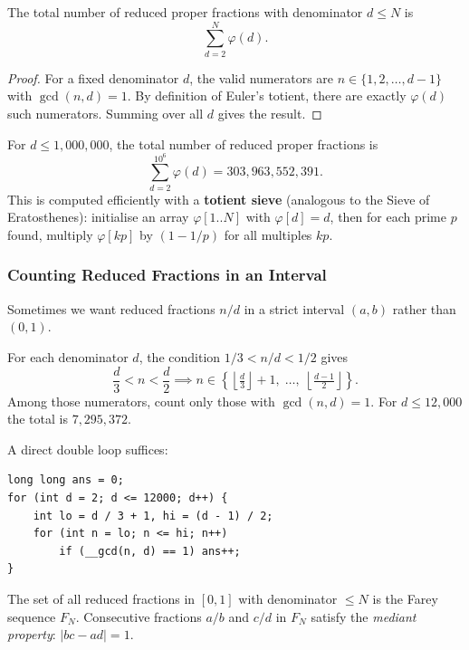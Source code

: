 \begin{theorem}
The total number of reduced proper fractions with denominator $d \le N$ is
\[
\sum_{d=2}^{N} \varphi(d).
\]
\end{theorem}
\begin{proof}
For a fixed denominator $d$, the valid numerators are $n \in \{1, 2, \ldots, d-1\}$ with $\gcd(n,d)=1$. By definition of Euler's totient, there are exactly $\varphi(d)$ such numerators. Summing over all $d$ gives the result.
\end{proof}

\begin{example}
For $d \le 1{,}000{,}000$, the total number of reduced proper fractions is
\[
\sum_{d=2}^{10^6} \varphi(d) = 303{,}963{,}552{,}391.
\]
This is computed efficiently with a \textbf{totient sieve} (analogous to the Sieve of Eratosthenes): initialise an array $\varphi[1..N]$ with $\varphi[d]=d$, then for each prime $p$ found, multiply $\varphi[kp]$ by $(1 - 1/p)$ for all multiples $kp$.
\end{example}

\subsubsection*{Counting Reduced Fractions in an Interval}

Sometimes we want reduced fractions $n/d$ in a strict interval $(a, b)$ rather than $(0,1)$.

\begin{example}
For each denominator $d$, the condition $1/3 < n/d < 1/2$ gives
\[
\frac{d}{3} < n < \frac{d}{2}
\implies n \in \left\{\left\lfloor\tfrac{d}{3}\right\rfloor + 1,\; \ldots,\; \left\lfloor\tfrac{d-1}{2}\right\rfloor\right\}.
\]
Among those numerators, count only those with $\gcd(n,d)=1$. For $d \le 12{,}000$ the total is $7{,}295{,}372$.

A direct double loop suffices:
\begin{verbatim}
long long ans = 0;
for (int d = 2; d <= 12000; d++) {
    int lo = d / 3 + 1, hi = (d - 1) / 2;
    for (int n = lo; n <= hi; n++)
        if (__gcd(n, d) == 1) ans++;
}
\end{verbatim}
\end{example}

\begin{remark}
The set of all reduced fractions in $[0,1]$ with denominator $\le N$ is the Farey sequence $F_N$. Consecutive fractions $a/b$ and $c/d$ in $F_N$ satisfy the \emph{mediant property}: $|bc - ad| = 1$.
\end{remark}

